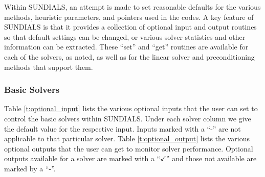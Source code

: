 Within SUNDIALS, an attempt is made to set reasonable defaults for the
various methods, heuristic parameters, and pointers used in the
codes. 
A key feature of SUNDIALS is that it provides a collection of optional
input and output routines so that default settings can be changed, or
various solver statistics and other information can be extracted.
These ``set'' and ``get'' routines are available for each of the solvers, as
noted, as well as for the linear solver and preconditioning methods that
support them.

\subsubsection*{Basic Solvers} 
Table \ref{t:optional_input} lists the various optional 
inputs that the user can set to control the basic solvers within SUNDIALS.
Under each solver column we give the default value for the respective
input. Inputs marked with a ``-'' are not applicable to that particular 
solver. Table \ref{t:optional_output} lists the various optional 
outputs that the user can get to monitor solver performance.
Optional outputs available for a solver are marked with a ``$\checkmark$''
and those not available are marked by a ``-''.

